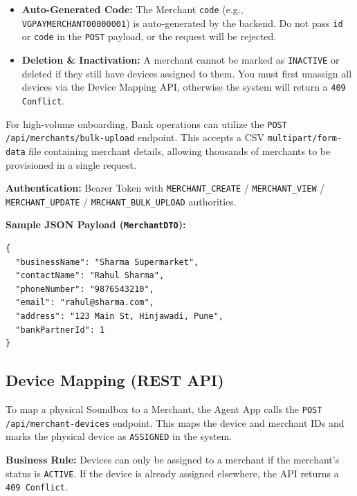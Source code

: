 \documentclass[11pt,a4paper]{article}
\begin{document}
\begin{tcolorbox}[colback=red!5!white,colframe=red!75!black,title=Strict Business Rules]
\begin{itemize}
    \item \textbf{Auto-Generated Code:} The Merchant \texttt{code} (e.g., \texttt{VGPAYMERCHANT00000001}) is auto-generated by the backend. Do not pass \texttt{id} or \texttt{code} in the \texttt{POST} payload, or the request will be rejected.
    \item \textbf{Deletion \& Inactivation:} A merchant cannot be marked as \texttt{INACTIVE} or deleted if they still have devices assigned to them. You must first unassign all devices via the Device Mapping API, otherwise the system will return a \texttt{409 Conflict}.
\end{itemize}
\end{tcolorbox}

For high-volume onboarding, Bank operations can utilize the \texttt{POST /api/\allowbreak merchants/\allowbreak bulk-upload} endpoint. This accepts a CSV \texttt{multipart/\allowbreak form-data} file containing merchant details, allowing thousands of merchants to be provisioned in a single request.

\textbf{Authentication:} Bearer Token with \texttt{MERCHANT\_CREATE} / \allowbreak \texttt{MERCHANT\_VIEW} / \allowbreak \texttt{MERCHANT\_UPDATE} / \allowbreak \texttt{MRCHANT\_BULK\_UPLOAD} authorities.

\textbf{Sample JSON Payload (\texttt{MerchantDTO}):}
\begin{lstlisting}
{
  "businessName": "Sharma Supermarket",
  "contactName": "Rahul Sharma",
  "phoneNumber": "9876543210",
  "email": "rahul@sharma.com",
  "address": "123 Main St, Hinjawadi, Pune",
  "bankPartnerId": 1
}
\end{lstlisting}

\subsection{Device Mapping (REST API)}

To map a physical Soundbox to a Merchant, the Agent App calls the \texttt{POST /api/\allowbreak merchant-devices} endpoint. This maps the device and merchant IDs and marks the physical device as \texttt{ASSIGNED} in the system.

\textbf{Business Rule:} Devices can only be assigned to a merchant if the merchant's status is \texttt{ACTIVE}. If the device is already assigned elsewhere, the API returns a \texttt{409 Conflict}.
\end{document}
